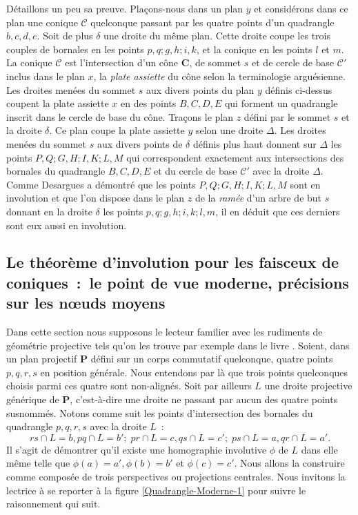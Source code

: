 \documentclass[12pt, a4paper]{article}
\newcommand{\cC}{\mathcal{C}}
\newcommand{\mathbb}{\mathbf}
\newcommand{\CC}{\mathbb{C}}
\newcommand{\PP}{\mathbb{P}}
\begin{document}
Détaillons un peu sa preuve. Plaçons-nous dans un plan $y$ et considérons dans ce plan une conique $\cC$ quelconque passant par les quatre points d'un quadrangle $b,c,d,e$. Soit de plus $\delta$ une droite du même plan. Cette droite coupe les trois couples de bornales en les points $p,q; g,h; i,k$, et la conique en les points $l$ et $m$. La conique $\cC$ est l'intersection d'un cône $\CC$, de sommet $s$ et de cercle de base $\cC'$ inclus dans le plan $x$, la \textit{plate assiette} du cône selon la terminologie arguésienne. Les droites menées du sommet $s$ aux divers points du plan $y$ définis ci-dessus coupent la plate assiette $x$ en des points $B,C,D,E$ qui forment un quadrangle inscrit dans le cercle de base du cône. Traçons le plan $z$ défini par le sommet $s$ et la droite $\delta$. Ce plan coupe la plate assiette $y$ selon une droite $\Delta$. Les droites menées du sommet $s$ aux divers points de $\delta$ définis plus haut donnent sur $\Delta$ les points $P,Q;G,H;I,K;L,M$ qui correspondent exactement aux intersections des bornales du quadrangle $B,C,D,E$ et du cercle de base $\cC'$ avec la droite $\Delta$. Comme Desargues a démontré que les points $P,Q;G,H;I,K;L,M$ sont en involution et que l'on dispose dans le plan $z$ de la \textit{ramée} d'un arbre de but $s$ donnant en la droite $\delta$ les points $p,q;g,h;i,k;l,m$, il en déduit que ces derniers sont eux aussi en involution.
\subsection{Le théorème d'involution pour les faisceux de coniques~:~le point de vue moderne, précisions sur les n{\oe}uds moyens}
Dans cette section nous supposons le lecteur familier avec les rudiments de géométrie projective tels qu'on les trouve par exemple dans le livre \cite{sidler}. Soient, dans un plan projectif $\PP$ défini sur un corps commutatif quelconque, quatre points $p,q,r,s$ en position générale. Nous entendons par là que trois points quelconques choisis parmi ces quatre sont non-alignés. Soit par ailleurs $L$ une droite projective générique de $\PP$, c'est-à-dire une droite ne passant par aucun des quatre points susnommés. Notons comme suit les points d'intersection des bornales du quadrangle $p,q,r,s$ avec la droite $L$~:~
\[
rs\cap L = b, pq\cap L = b';\; pr\cap L=c, qs\cap L=c';\; ps\cap L =a, qr\cap L= a'.
\]
Il s'agit de démontrer qu'il existe une homographie involutive $\phi$ de $L$ dans elle même telle que $\phi(a)=a', \phi(b)=b'$ et $\phi(c)=c'$. Nous allons la construire comme composée de trois perspectives ou projections centrales. Nous invitons la lectrice à se reporter à la figure \ref{Quadrangle-Moderne-1} pour suivre le raisonnement qui suit. 
\end{document}
